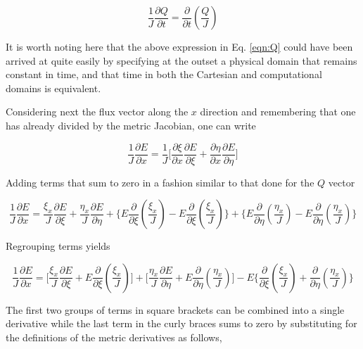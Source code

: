 \begin{equation}
	\frac{1}{J}\frac{\partial Q}{\partial t} = \frac{\partial}{\partial t}(\frac{Q}{J}) 
\label{eqn:Q}
\end{equation}

	It is worth noting here that the above expression in Eq. \ref{eqn:Q} could have been arrived at quite
easily by specifying at the outset a physical domain that remains constant in time, and that time in both the Cartesian
and computational domains is equivalent.

	Considering next the flux vector along the $x$ direction and remembering that one has already divided by the
metric Jacobian, one can write 

\begin{displaymath}
	\frac{1}{J}\frac{\partial E}{\partial x} = \frac{1}{J}\Big[\frac{\partial \xi}{\partial x}\frac{\partial E}{\partial \xi}
	+ \frac{\partial \eta}{\partial x}\frac{\partial E}{\partial \eta}\Big]
\end{displaymath} 

	Adding terms that sum to zero in a fashion similar to that done for the $Q$ vector

\begin{displaymath}
	\frac{1}{J}\frac{\partial E}{\partial x} = \frac{\xi_x}{J}\frac{\partial E}{\partial \xi}
	+\frac{\eta_x}{J}\frac{\partial E}{\partial \eta} + \Big\{E \frac{\partial}{\partial \xi}
	(\frac{\xi_x}{J}) - E\frac{\partial}{\partial \xi}(\frac{\xi_x}{J})\Big\}
	+ \Big\{E\frac{\partial}{\partial \eta}(\frac{\eta_x}{J}) - E\frac{\partial}{\partial \eta}(\frac{\eta_x}{J})\Big\}
\end{displaymath}

	Regrouping terms yields

\begin{displaymath}
	\frac{1}{J}\frac{\partial E}{\partial x} = 
	\Big[\frac{\xi_x}{J}\frac{\partial E}{\partial \xi}
	+ E \frac{\partial}{\partial \xi}(\frac{\xi_x}{J})\Big]
	+ \Big[\frac{\eta_x}{J}\frac{\partial E}{\partial \eta} 
	+ E \frac{\partial}{\partial \eta}(\frac{\eta_x}{J}) \Big]
	-E \Big\{\frac{\partial}{\partial \xi}(\frac{\xi_x}{J})
	+ \frac{\partial}{\partial \eta}(\frac{\eta_x}{J})\Big\}
\end{displaymath}

	The first two groups of terms in square brackets can be combined into a single derivative while the last
term in the curly braces sums to zero by substituting for the definitions of the metric derivatives as follows,

